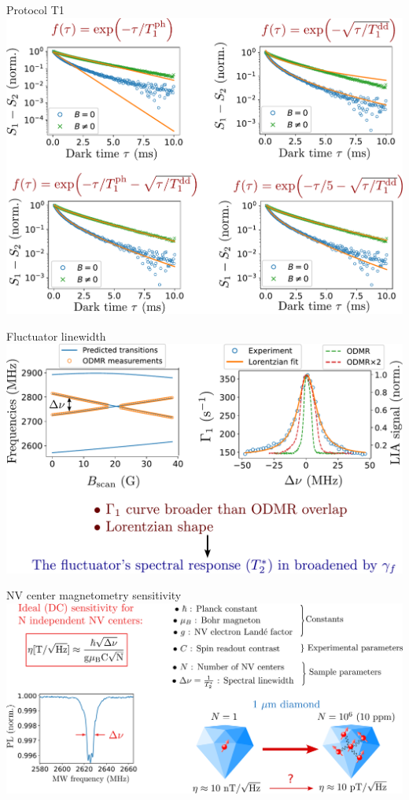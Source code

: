 \documentclass{beamer}
\begin{document}
\begin{frame}{Protocol T1}
\centering
\includegraphics[width=\textwidth,height=0.85\textheight,keepaspectratio]{Slide_T1_exp_et_stretch}
\end{frame}

\begin{frame}{Fluctuator linewidth}
\centering
\includegraphics[width=\textwidth,height=0.85\textheight,keepaspectratio]{slide_fluct_linewidth}
\end{frame}

\begin{frame}{NV center magnetometry sensitivity}
\centering
\includegraphics[width=\textwidth,height=0.85\textheight,keepaspectratio]{Slide_NV_limite_sensi}
\end{frame}
\end{document}
